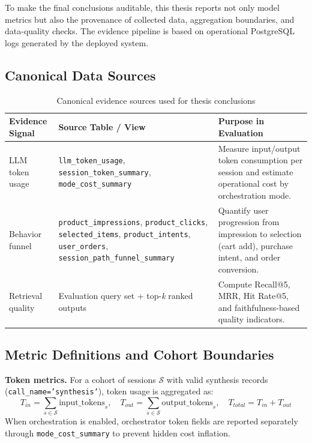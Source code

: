 \documentclass[12pt, twoside]{report}
\begin{document}
To make the final conclusions auditable, this thesis reports not only model metrics but also the provenance of collected data, aggregation boundaries, and data-quality checks. The evidence pipeline is based on operational PostgreSQL logs generated by the deployed system.

\subsection{Canonical Data Sources}
\label{subsec:canonical_data_sources}

\begin{table}[H]
\centering
\begin{tabular}{p{3.2cm}p{4.1cm}p{6.6cm}}
\toprule
\textbf{Evidence Signal} & \textbf{Source Table / View} & \textbf{Purpose in Evaluation}\\
\midrule
LLM token usage & \texttt{llm\_token\_usage}, \texttt{session\_token\_summary}, \texttt{mode\_cost\_summary} & Measure input/output token consumption per session and estimate operational cost by orchestration mode.\\
Behavior funnel & \texttt{product\_impressions}, \texttt{product\_clicks}, \texttt{selected\_items}, \texttt{product\_intents}, \texttt{user\_orders}, \texttt{session\_path\_funnel\_summary} & Quantify user progression from impression to selection (cart add), purchase intent, and order conversion.\\
Retrieval quality & Evaluation query set + top-\textit{k} ranked outputs & Compute Recall@5, MRR, Hit Rate@5, and faithfulness-based quality indicators.\\
\bottomrule
\end{tabular}
\caption{Canonical evidence sources used for thesis conclusions}
\label{tab:canonical_evidence_sources}
\end{table}

\subsection{Metric Definitions and Cohort Boundaries}
\label{subsec:metric_definitions_boundaries}

\textbf{Token metrics.}
For a cohort of sessions $\mathcal{S}$ with valid synthesis records (\texttt{call\_name='synthesis'}), token usage is aggregated as:
\begin{equation}
T_{in}=\sum_{s \in \mathcal{S}} \text{input\_tokens}_s,\quad
T_{out}=\sum_{s \in \mathcal{S}} \text{output\_tokens}_s,\quad
T_{total}=T_{in}+T_{out}
\end{equation}
When orchestration is enabled, orchestrator token fields are reported separately through \texttt{mode\_cost\_summary} to prevent hidden cost inflation.
\end{document}
